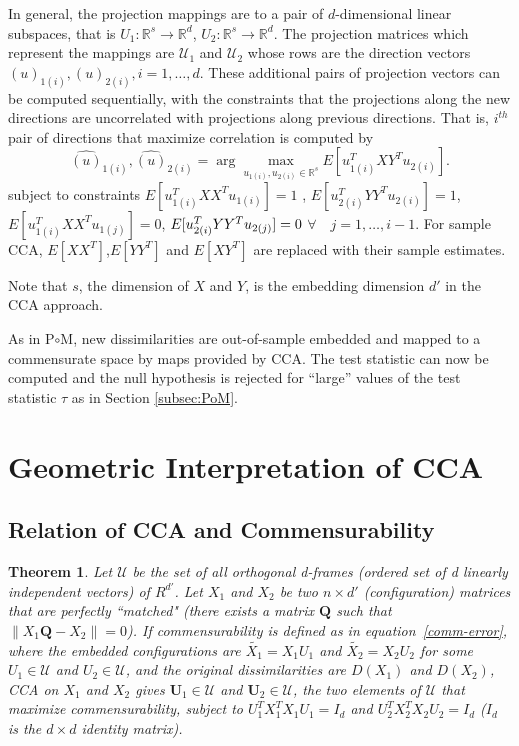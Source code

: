 \documentclass[12pt,oneside,final]{thesis}\usepackage[]{graphicx}\usepackage[]{color}
\newtheorem{thm}{Theorem}
\begin{document}
In general, the projection mappings are to a pair of $d$-dimensional linear subspaces, that is $U_1:\mathbb{R}^s \rightarrow  \mathbb{R}^{d}$, $U_2 :\mathbb{R}^s \rightarrow  \mathbb{R}^{d}$. The projection matrices which represent the mappings are $\mathcal{U}_1$ and $\mathcal{U}_2$  whose rows are the direction vectors ${{(u)}_{1(i)},{(u)}_{2(i)}}, i=1,\ldots,d $. These additional pairs of projection vectors can be computed sequentially, with the constraints that the projections along the new directions are uncorrelated with  projections along previous directions. That is, $i^{th}$ pair of directions  that maximize correlation is computed by 
$$
{\hat{(u)}_{1(i)},\hat{(u)}_{2(i)}}=\arg\max_{u_{1(i)},u_{2(i)}\in\mathbb{R}^s} {E[u_{1(i)}^{T}XY^Tu_{2(i)}]}.$$ subject to constraints $E[{u_{1(i)}^{T}XX^T u_{1(i)}}]=1$ , $E[{u_{2(i)}^{T}YY^T u_{2(i)}}]=1$, $E[{u_{1(i)}^{T}XX^T u_{1(j)}}]=0$,  
   $ E[{u_{2(i)}^{T}YY^T u_{2(j)}}]=\nolinebreak0$ $\forall \quad  j=1,\ldots,i-1$. For sample CCA, $E[XX^T]$,$E[YY^T]$ and $E[XY^T]$ are replaced with their sample estimates.


Note that $s$, the dimension of $X$ and $Y$, is the embedding dimension $d'$  in the CCA approach. 


As in P$ \circ $M, new dissimilarities are out-of-sample embedded and mapped to a commensurate  space by maps provided by CCA. The test statistic   can now be computed and  the null hypothesis is rejected for ``large'' values of the test statistic $\tau$  as in Section \ref{subsec:PoM}.



\section{Geometric Interpretation of CCA}




\subsection{Relation of CCA and Commensurability} 

\begin{thm}
Let $ \mathcal{U}$ be the set of all orthogonal d-frames 
(ordered set of d linearly independent vectors) of $R^{d'}$. 
Let $X_1$ and $X_2$  be two $n\times d'$ (configuration) matrices that are perfectly ``matched"
 (there exists a  matrix $\mathbf{Q}$ such that $\|   X_1\mathbf{Q}  -X_2 \|=0$).
If commensurability is  defined as
in equation~\eqref{comm-error},
 where  the embedded configurations are $\tilde{X_1}=X_1U_1$ and $\tilde{X_2}=X_2U_2$ for some  $U_1\in \mathcal{U}$ and $U_2\in  \mathcal{U}$,
and   the original dissimilarities are $D(X_1)$ and $D(X_2) $,
 CCA on $X_1$ and $X_2$ gives $\mathbf{U}_1\in\mathcal{U}$ and  $\mathbf{U}_2\in\mathcal{U}$, 
 the two elements of $\mathcal{U}$ that maximize commensurability, subject to $U_1^{T}X_1^{T}X_1U_1=I_d$ and $U_2^{T}X_2^{T}X_2U_2=I_d$ ($I_d$ is the $d \times d$ identity matrix).
\end{thm}
\end{document}
